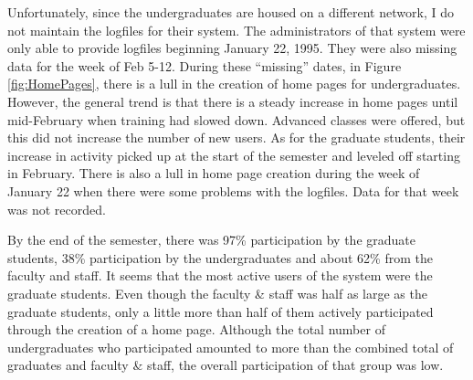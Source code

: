 Unfortunately, since the undergraduates are housed on a different network, I do
not maintain the logfiles for their system.  The administrators of that system
were only able to provide logfiles beginning January 22, 1995.  They were also
missing data for the week of Feb 5-12.  During these ``missing'' dates, in
Figure \ref{fig:HomePages}, there is a lull in the creation of home pages for
undergraduates.  However, the general trend is that there is a steady increase
in home pages until mid-February when training had slowed down.  Advanced
classes were offered, but this did not increase the number of new users.  As
for the graduate students, their increase in activity picked up at the start of
the semester and leveled off starting in February.  There is also a lull in
home page creation during the week of January 22 when there were some problems
with the logfiles.  Data for that week was not recorded.

By the end of the semester, there was 97\% participation by the graduate
students, 38\% participation by the undergraduates and about 62\% from the
faculty and staff.  It seems that the most active users of the system were the
graduate students.  Even though the faculty \& staff was half as large as the
graduate students, only a little more than half of them actively participated
through the creation of a home page.  Although the total number of
undergraduates who participated amounted to more than the combined total of
graduates and faculty \& staff, the overall participation of that group was
low.

